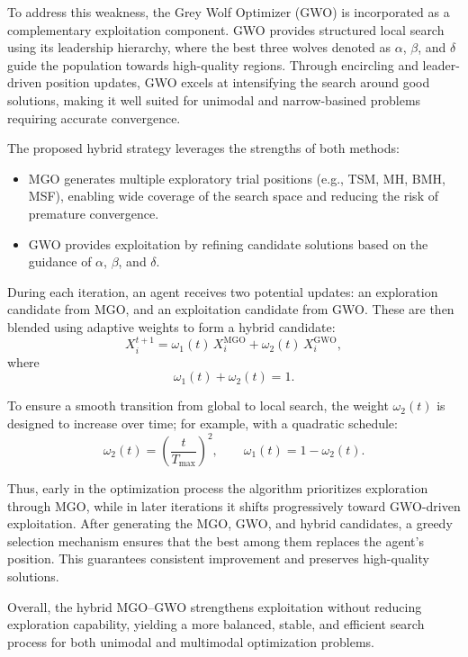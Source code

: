 \documentclass[12pt,a4paper]{article}
\begin{document}
To address this weakness, the Grey Wolf Optimizer (GWO) is incorporated as a complementary exploitation 
component. GWO provides structured local search using its leadership hierarchy, where the best three wolves 
denoted as $\alpha$, $\beta$, and $\delta$ guide the population towards high-quality regions. Through 
encircling and leader-driven position updates, GWO excels at intensifying the search around good solutions, 
making it well suited for unimodal and narrow-basined problems requiring accurate convergence.

The proposed hybrid strategy leverages the strengths of both methods:
\begin{itemize}
    \item MGO generates multiple exploratory trial positions (e.g., TSM, MH, BMH, MSF), enabling wide coverage of the search space and reducing the risk of premature convergence.
    \item GWO provides exploitation by refining candidate solutions based on the guidance of $\alpha$, $\beta$, and $\delta$.
\end{itemize}

During each iteration, an agent receives two potential updates: an exploration candidate from MGO, and an exploitation candidate from GWO.
These are then blended using adaptive weights to form a hybrid candidate:
\[
X_i^{t+1} = \omega_{1}(t)\,X_{i}^{\mathrm{MGO}} + \omega_{2}(t)\,X_{i}^{\mathrm{GWO}},
\]
where
\[
\omega_{1}(t) + \omega_{2}(t) = 1.
\]

To ensure a smooth transition from global to local search, the weight $\omega_{2}(t)$ is designed to increase over time; for example, with a quadratic schedule:
\[
\omega_{2}(t) = \left(\frac{t}{T_{\max}}\right)^{2}, \qquad
\omega_{1}(t) = 1 - \omega_{2}(t).
\]

Thus, early in the optimization process the algorithm prioritizes exploration through MGO, while in later iterations it shifts progressively toward GWO-driven exploitation. After generating the MGO, GWO, and hybrid candidates, a greedy selection mechanism ensures that the best among them replaces the agent’s position. This guarantees consistent improvement and preserves high-quality solutions.

Overall, the hybrid MGO--GWO strengthens exploitation without reducing exploration capability, yielding a more balanced, stable, and efficient search process for both unimodal and multimodal optimization problems.
\end{document}
